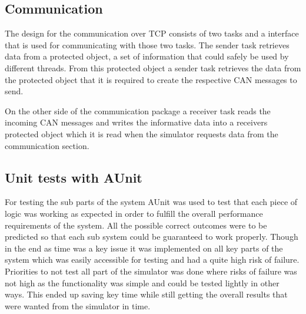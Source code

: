 \subsection{Communication}

The design for the communication over TCP consists of two tasks and a interface that is used for communicating with those two tasks. The sender task retrieves data from a protected object, a set of information that could safely be used by different threads. From this protected object a sender task retrieves the data from the protected object that it is required to create the respective CAN messages to send.

On the other side of the communication package a receiver task reads the incoming CAN messages and writes the informative data into a receivers protected object which it is read when the simulator requests data from the communication section.

\subsection{Unit tests with AUnit}

For testing the sub parts of the system AUnit was used to test that each piece of logic was working as expected in order to fulfill the overall performance requirements of the system.  All the possible correct outcomes were to be predicted so that each sub system could be guaranteed to work properly. Though in the end as time was a key issue it was implemented on all key parts of the system which was easily accessible for testing and had a quite high risk of failure. Priorities to not test all part of the simulator was done where risks of failure was not high as the functionality was simple and could be tested lightly in other ways. This ended up saving key time while still getting the overall results that were wanted from the simulator in time.

